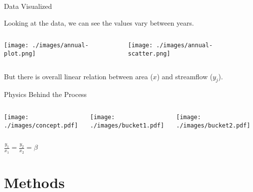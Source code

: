 \documentclass{beamer}
\begin{document}
\begin{frame}{Data Visualized}

  Looking at the data, we can see the values vary between years.

  \begin{columns}
    \texttt{[image: ./images/annual-plot.png]}
    \pause
    
    \texttt{[image: ./images/annual-scatter.png]}
  \end{columns}
  
     But there is overall linear relation between area (\(x\)) and streamflow (\(y_j\)).
  
\end{frame}

\begin{frame}{Physics Behind the Process}
\begin{columns}
  \texttt{[image: ./images/concept.pdf]}

  \pause
  
  \texttt{[image: ./images/bucket1.pdf]}
  
  \pause

  \texttt{[image: ./images/bucket2.pdf]}
  
\end{columns}

  $\frac{y_1}{x_1} = \frac{y_2}{x_2} = \beta$
  
\end{frame}

\section{Methods}
\end{document}
